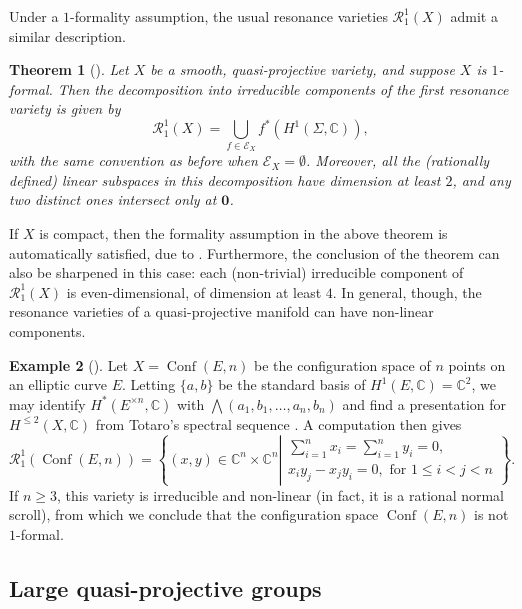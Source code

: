 \documentclass{article}
\numberwithin{equation}{section}
\newtheorem{theorem}{Theorem}[section]
\theoremstyle{definition}
\newtheorem{example}[theorem]{Example}
\renewcommand{\C}{\mathbb{C}}
\newcommand{\RR}{\mathcal{R}}
\DeclareMathOperator{\Conf}{Conf}
\newcommand{\zero}{\mathbf{0}}
\begin{document}
Under a $1$-formality assumption, the usual resonance varieties $\RR^1_1(X)$ 
admit a similar description. 

\begin{theorem}[\cite{DPS-duke}]
\label{thm:res kahler} 
Let $X$ be a smooth, quasi-projective variety, and suppose $X$ is $1$-formal. 
Then the decomposition into irreducible components of the first resonance 
variety is given by
\begin{equation}
\label{eq:r1dec}
\RR^1_1(X)= \bigcup_{f\in \mathcal{E}_X} f^*(H^1(\Sigma,\C)), 
\end{equation}
with the same convention as before when $\mathcal{E}_X = \emptyset$.  
Moreover, all the (rationally defined) linear subspaces in this  
decomposition have dimension at least $2$, and any two 
distinct ones intersect only at $\zero$. 
\end{theorem}

If $X$ is compact, then the formality assumption 
in the above theorem is automatically satisfied, due to \cite{DGMS}.  
Furthermore, the conclusion of the theorem can also 
be sharpened in this case: each (non-trivial) irreducible component 
of $\RR^1_1(X)$ is even-dimensional, of dimension at least $4$.   
In general, though, the resonance varieties of a quasi-projective 
manifold can have non-linear components.  

\begin{example}[\cite{DPS-duke}]
\label{ex:res-config}
Let $X=\Conf(E,n)$ be the configuration space of $n$ 
points on an elliptic curve $E$.  Letting $\{ a, b\}$ be the 
standard basis of $H^1(E,\C)=\C^2$, we may identify 
$H^*( E^{\times n}, \C)$ with $\bigwedge(a_1, b_1,\dots , a_n, b_n)$ 
and find a presentation for $H^{\le 2}(X,\C)$ from Totaro's spectral sequence 
\cite{To96}. A computation then gives
\begin{equation} 
\label{eq:resg1}
\RR^1_1(\Conf(E,n))=\left\{ (x,y) \in \C^n\times \C^n \left|
\begin{array}{l}
\sum_{i=1}^n x_i=\sum_{i=1}^n y_i=0 ,\\[2pt]
x_i y_j-x_j y_i=0,  \text{ for $1\le i<j< n$}
\end{array}
\right\}. \right.
\end{equation}
If $n\ge 3$, this variety is irreducible and non-linear (in fact, it is a 
rational normal scroll), from which we conclude that the configuration 
space $\Conf(E,n)$ is not $1$-formal.
\end{example}

\subsection{Large quasi-projective groups}
\label{subsec:qplarge}
\end{document}

